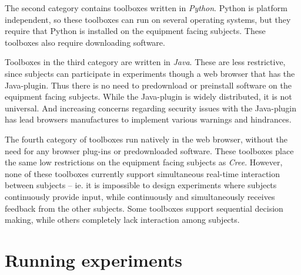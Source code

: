 \documentclass[preprint, 12pt]{elsarticle}
\newcommand{\Cree}{\emph{Cree}\xspace}
\begin{document}
The second category contains toolboxes written in \emph{Python}. Python is platform independent, so these toolboxes can run on several operating systems, but they require that Python is installed on the equipment facing subjects\footnotemark[2]. These toolboxes also require downloading software.


Toolboxes in the third category are written in \emph{Java}. These are less restrictive, since subjects can participate in experiments though a web browser that has the Java-plugin. Thus there is no need to predownload or preinstall software on the equipment facing subjects. While the Java-plugin is widely distributed, it is not universal\footnotemark[3]. And increasing concerns regarding security issues with the Java-plugin has lead browsers manufactures to implement various warnings and hindrances\footnotemark[4]. 

 

The fourth category of toolboxes run natively in the web browser, without the need for any browser plug-ins or predownloaded software. These toolboxes place the same low restrictions on the equipment facing subjects as \Cree. However, none of these toolboxes currently support simultaneous real-time interaction between subjects -- ie. it is impossible to design experiments where subjects continuously provide input, while continuously and simultaneously receives feedback from the other subjects. Some toolboxes support sequential decision making, while others completely lack interaction among subjects.


\section{Running experiments}
\label{S:Running}
\end{document}
